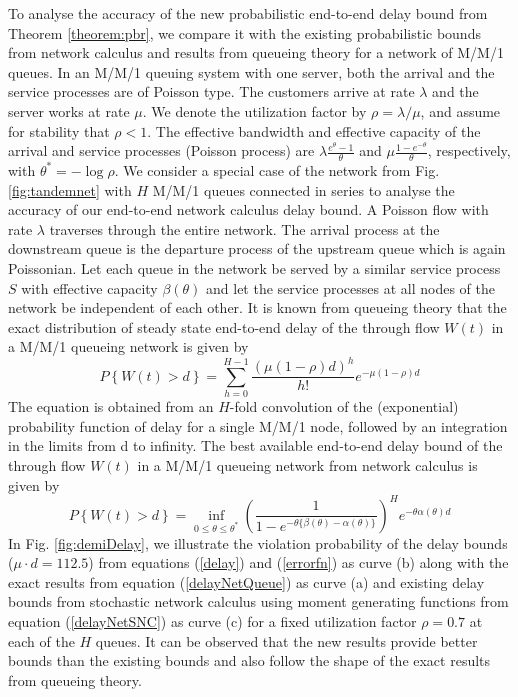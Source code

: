 \documentclass[letterpaper]{IEEEtran}
\begin{document}
To analyse the accuracy of the new probabilistic end-to-end delay bound from Theorem \ref{theorem:pbr}, we compare it with the existing probabilistic bounds from network calculus and results from queueing theory for a network of M/M/1 queues. In an M/M/1 queuing system with one server, both the arrival and the service processes are of Poisson type. The customers arrive at rate $\lambda$ and the server works at rate $\mu$. We denote the utilization factor by $\rho = \lambda / \mu $, and assume for stability that $\rho < 1$. The effective bandwidth and effective capacity of the arrival and service processes (Poisson process) are $\lambda \frac{e^{\theta}-1}{\theta}$ and $\mu \frac{1 - e^{-\theta}}{\theta}$, respectively, with $\theta^* = -\log{\rho}$. We consider a special case of the network from Fig. \ref{fig:tandemnet} with $H$ M/M/1 queues connected in series to analyse the accuracy of our end-to-end network calculus delay bound. A Poisson flow with rate $\lambda$ traverses through the entire network. The arrival process at the downstream queue is the departure process of the upstream queue which is again Poissonian. Let each queue in the network be served by a similar service process $S$ with effective capacity $\beta(\theta)$ and let the service processes at all nodes of the network be independent of each other. It is known from queueing theory that the exact distribution of steady state end-to-end delay of the through flow $W(t)$ in a M/M/1 queueing network is given by 
\small
\begin{equation}
P\left\{W(t) > d \right\} =  \sum_{h=0}^{H-1} \frac{(\mu (1-\rho)d)^h}{h!} e^{-\mu (1-\rho)d} \label{delayNetQueue}
\end{equation}
\normalsize
The equation is obtained from an $H$-fold convolution of the (exponential) probability function of delay for a single M/M/1 node, followed by an integration in the limits from d to infinity.
The best available end-to-end delay bound of the through flow $W(t)$ in a M/M/1 queueing network from network calculus \cite{florin:2007-1,fidler:2006} is given by
\small
\begin{equation}
P\left\{W(t) > d \right\} =  \inf_{0 \le \theta \le \theta^*}{\left(\frac{1}{1-e^{-\theta\{\beta(\theta)-\alpha(\theta)\}}}\right)^H e^{-\theta \alpha(\theta)d}} \label{delayNetSNC}
\end{equation}
\normalsize
In Fig. \ref{fig:demiDelay}, we illustrate the violation probability of the delay bounds ($\mu \cdot d=112.5$) from equations (\ref{delay}) and (\ref{errorfn}) as curve (b) along with the exact results from equation (\ref{delayNetQueue}) as curve (a) and existing delay bounds from stochastic network calculus using moment generating functions \cite{fidler:2006,florin:2007-1} from equation (\ref{delayNetSNC}) as curve (c) for a fixed utilization factor $\rho = 0.7$ at each of the $H$ queues. It can be observed that the new results provide better bounds than the existing bounds and also follow the shape of the exact results from queueing theory. 
\end{document}
